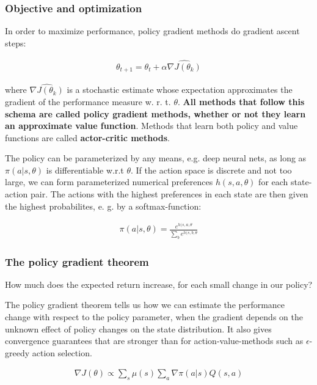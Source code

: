 \subsubsection{Objective and optimization}

In order to maximize performance, policy gradient methods do gradient ascent steps:

\begin{align}
    \theta_{t+1} = \theta_t + \alpha \widehat{\nabla J(\theta_k)}
\end{align}

where $\widehat{\nabla J(\theta_k)}$ is a stochastic estimate whose expectation approximates the gradient of the performance measure w. r. t. $\theta$. \textbf{All methods that follow this schema are called policy gradient methods, whether or not they learn an approximate value function}. Methods that learn both policy and value functions are called \textbf{actor-critic methods}.

The policy can be parameterized by any means, e.g. deep neural nets, as long as $\pi(a|s, \theta)$ is differentiable w.r.t $\theta$. If the action space is discrete and not too large, we can form parameterized numerical preferences $h(s, a, \theta)$ for each state-action pair. The actions with the highest preferences in each state are then given the highest probabilites, e. g. by a softmax-function:

\begin{align}
    \pi(a|s, \theta) = \frac{e^{h(s, a, \theta}}{\sum_b e^{h(s, b, \theta}}
\end{align}

\subsubsection{The policy gradient theorem}

How much does the expected return increase, for each small change in our policy? 

The policy gradient theorem tells us how we can estimate the performance change with respect to the policy parameter, when the gradient depends on the unknown effect of policy changes on the state distribution. It also gives convergence guarantees that are stronger than for action-value-methods such as $\epsilon$-greedy action selection. 

\begin{align}
    \nabla J(\theta) \propto \sum_s \mu(s) \sum_a \nabla \pi(a|s)Q(s, a)
\end{align}

